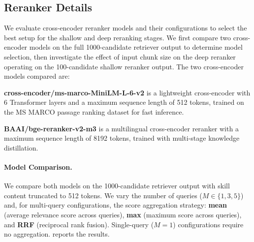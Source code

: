 \documentclass[11pt]{article}
\begin{document}
\begin{table}[t]
  \centering
  \caption{Retriever model comparison on SkillsBench oracle skill retrieval.
  Models suffixed with ``+ content'' embed the full skill content instead of the description only.
  Bold indicates best per column.
  All metrics are averaged across tasks.}
  \label{tab:retriever_comparison}
  
\end{table}

\begin{table}[t]
  \centering
  \caption{Retriever query configuration comparison (BGE-base, description-only).
  $M$ denotes the number of generated queries. $tk$ denotes the per-query retrieval depth.
  Bold indicates best per column within each aggregation group.
  All metrics are averaged across tasks.}
  \label{tab:retriever_query_config}
  
\end{table}

\subsection{Reranker Details}
\label{sec:reranker_details}

We evaluate cross-encoder reranker models and their configurations to select the best setup for the shallow and deep reranking stages.
We first compare two cross-encoder models on the full 1000-candidate retriever output to determine model selection, then investigate the effect of input chunk size on the deep reranker operating on the 100-candidate shallow reranker output.
The two cross-encoder models compared are:

\textbf{cross-encoder/ms-marco-MiniLM-L-6-v2} \citep{reimers2019sentence} is a lightweight cross-encoder with 6 Transformer layers and a maximum sequence length of 512 tokens, trained on the MS MARCO passage ranking dataset for fast inference.

\textbf{BAAI/bge-reranker-v2-m3} \citep{chen2024m3} is a multilingual cross-encoder reranker with a maximum sequence length of 8192 tokens, trained with multi-stage knowledge distillation.

\paragraph{Model Comparison.}
We compare both models on the 1000-candidate retriever output with skill content truncated to 512 tokens.
We vary the number of queries ($M \in \{1, 3, 5\}$) and, for multi-query configurations, the score aggregation strategy: \textbf{mean} (average relevance score across queries), \textbf{max} (maximum score across queries), and \textbf{RRF} (reciprocal rank fusion).
Single-query ($M = 1$) configurations require no aggregation.
 reports the results.
\end{document}
